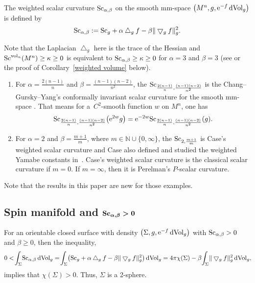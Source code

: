 \documentclass[10pt,a4paper]{amsart}
\begin{document}
 \begin{Definition}
 The weighted scalar curvature ${\rm Sc}_{\alpha, \beta}$ on the smooth mm-space $\big(M^n, g, {\rm e}^{-f}\,{\rm dVol}_g\big)$ is defined by
 \begin{gather*}
 {\rm Sc}_{\alpha, \beta}:= {\rm Sc}_g + \alpha \bigtriangleup_gf - \beta\| \bigtriangledown_gf\|^2_g.
 \end{gather*}
 \end{Definition}
 Note that the Laplacian $\bigtriangleup_g$ here is the trace of the Hessian and ${\rm Sc}^{{\rm vol}_n}(M^n)\geq \kappa\geq 0$ is equivalent to ${\rm Sc}_{\alpha, \beta}\geq \kappa\geq 0$ for $\alpha=3$ and $\beta=3$ (see \cite[Theorem~8]{MR1458581} or the proof of Corollary~\ref{weighted volume} below).
 \begin{Example}\quad
 \begin{enumerate}\itemsep=0pt
 \item[1.] For $\alpha=\frac{2(n-1)}{n}$ and $\beta=\frac{(n-1)(n-2)}{n^2}$, the ${\rm Sc}_{\frac{2(n-1)}{n}, \frac{(n-1)(n-2)}{n^2}}$ is the Chang--Gursky--Yang's conformally invariant scalar curvature for the smooth mm-space \cite{MR2203156}. That means for a~$C^2$-smooth function $w$ on $M^n$, one has
 \begin{align*}
 {\rm Sc}_{\frac{2(n-1)}{n}, \frac{(n-1)(n-2)}{n^2}}\big({\rm e}^{2w}g\big)={\rm e}^{-2w}{\rm Sc}_{\frac{2(n-1)}{n}, \frac{(n-1)(n-2)}{n^2}}(g).
\end{align*}
\item[2.] For $\alpha=2$ and $\beta=\frac{m+1}{m}$, where $m\in \mathbb{N}\cup \{0, \infty\}$, the ${\rm Sc}_{2, \frac{m+1}{m}}$ is Case's weighted scalar curvature and Case also defined and studied the weighted Yamabe constants in~\cite{MR3116020}. Case's weighted scalar curvature is the classical scalar curvature if $m=0$. If $m=\infty$, then it is Perelman's $P$-scalar curvature.
 \end{enumerate}
\end{Example}
Note that the results in this paper are new for those examples.

 \subsection[Spin manifold and Sc(alpha,beta)>0]{Spin manifold and $\boldsymbol{{\rm Sc}_{\alpha, \beta}> 0}$}
 For an orientable closed surface with density $\big(\Sigma, g, {\rm e}^{-f}\,{\rm dVol}_g\big)$ with ${\rm Sc}_{\alpha, \beta} > 0$ and $\beta\geq 0$, then the inequality,
\begin{gather*}
0 < \!\int_\Sigma\! {\rm Sc}_{\alpha, \beta} \,{\rm dVol}_g = \!\int_\Sigma\! \big({\rm Sc}_g + \alpha\bigtriangleup_gf - \beta\|\bigtriangledown_gf\|_g^2\big) \,{\rm dVol}_g
 = 4\pi\chi(\Sigma) - \beta\!\int_\Sigma\! \|\bigtriangledown_gf\|_g^2 \,{\rm dVol}_g,\!
\end{gather*}
implies that $\chi(\Sigma)> 0$. Thus, $\Sigma$ is a 2-sphere.
\end{document}
